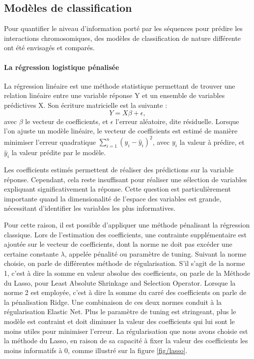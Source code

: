 \documentclass[french]{llncs}
\begin{document}
\subsection{Modèles de classification}\label{section:models}

Pour quantifier le niveau d'information porté par les séquences pour prédire les interactions chromosomiques, des modèles de classification de nature différente ont été envisagés et comparés.

\paragraph{La régression logistique pénalisée}

La régression linéaire est une méthode statistique permettant de trouver une relation linéaire entre une variable réponse Y et un ensemble de variables prédictives X.
Son écriture matricielle est la suivante :
\begin{equation}
Y = X\beta + \epsilon,
\end{equation}
avec $\beta$ le vecteur de coefficients, et $\epsilon$ l'erreur aléatoire, dite résiduelle. Lorsque l'on ajuste un modèle linéaire, le vecteur de coefficients est estimé de manière minimiser l'erreur quadratique $\sum_{i = 1}^{n}(y_i - \hat{y}_i)^2$, avec $y_i$ la valeur à prédire, et $\hat{y}_i$ la valeur prédite par le modèle.


Les coefficients estimés permettent de réaliser des prédictions sur la variable réponse. Cependant, cela reste insuffisant pour réaliser une sélection de variables expliquant significativement la réponse. Cette question est particulièrement importante quand la dimensionalité de l'espace des variables est grande, nécessitant d'identifier les variables les plus informatives.

Pour cette raison, il est possible d'appliquer une méthode pénalisant la régression classique. Lors de l'estimation des coefficients, une contrainte supplémentaire est ajoutée sur le vecteur de coefficients, dont la norme ne doit pas excéder une certaine constante $\lambda$, appelée pénalité ou paramètre de tuning. Suivant la norme choisie, on parle de différentes méthode de régularisation. S'il s'agit de la norme 1, c'est à dire la somme en valeur absolue des coefficients, on parle de la Méthode du Lasso, pour Least Absolute Shrinkage and Selection Operator. Lorsque la norme 2 est employée, c'est à dire la somme du carré des coefficients on parle de la pénalisation Ridge. Une combinaison de ces deux normes conduit à la régularisation Elastic Net. Plus le paramètre de tuning est stringeant, plus le modèle est contraint et doit diminuer la valeur des coefficients qui lui sont le moins utiles pour minimiser l'erreur. La régularisation que nous avons choisie est la méthode du Lasso, en raison de sa capacité à fixer la valeur des coefficients les moins informatifs à 0, comme illustré sur la figure \ref{fig/lasso}.
\end{document}

